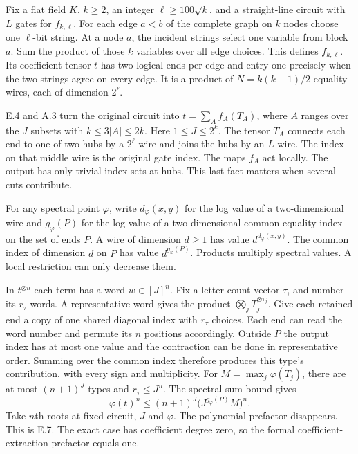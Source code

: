 \clearpage
{}\label{sec:14flat}

Fix a flat field $K$, $k\ge2$, an integer $\ell\ge100\sqrt{k}$, and a straight-line circuit with $L$ gates for $f_{k,\ell}$. For each edge $a<b$ of the complete graph on $k$ nodes choose one $\ell$-bit string. At a node $a$, the incident strings select one variable from block $a$. Sum the product of those $k$ variables over all edge choices. This defines $f_{k,\ell}$. Its coefficient tensor $t$ has two logical ends per edge and entry one precisely when the two strings agree on every edge. It is a product of $N=k(k-1)/2$ equality wires, each of dimension $2^\ell$.

E.4 and A.3 turn the original circuit into $t=\sum_A f_A(T_A)$, where $A$ ranges over the $J$ subsets with $k\le3|A|\le2k$. Here $1\le J\le2^k$. The tensor $T_A$ connects each end to one of two hubs by a $2^\ell$-wire and joins the hubs by an $L$-wire. The index on that middle wire is the original gate index. The maps $f_A$ act locally. The output has only trivial index sets at hubs. This last fact matters when several cuts contribute.

For any spectral point $\varphi$, write $d_\varphi(x,y)$ for the log value of a two-dimensional wire and $g_\varphi(P)$ for the log value of a two-dimensional common equality index on the set of ends $P$. A wire of dimension $d\ge1$ has value $d^{d_\varphi(x,y)}$. The common index of dimension $d$ on $P$ has value $d^{g_\varphi(P)}$. Products multiply spectral values. A local restriction can only decrease them.

In $t^{\otimes n}$ each term has a word $w\in[J]^n$. Fix a letter-count vector $\tau$, and number its $r_\tau$ words. A representative word gives the product $\bigotimes_jT_j^{\otimes\tau_j}$. Give each retained end a copy of one shared diagonal index with $r_\tau$ choices. Each end can read the word number and permute its $n$ positions accordingly. Outside $P$ the output index has at most one value and the contraction can be done in representative order. Summing over the common index therefore produces this type's contribution, with every sign and multiplicity. For $M=\max_j\varphi(T_j)$, there are at most $(n+1)^J$ types and $r_\tau\le J^n$. The spectral sum bound gives
\[
 \varphi(t)^n\le(n+1)^J\big(J^{g_\varphi(P)} M\big)^n.
\]
Take $n$th roots at fixed circuit, $J$ and $\varphi$. The polynomial prefactor disappears. This is E.7. The exact case has coefficient degree zero, so the formal coefficient-extraction prefactor equals one.

